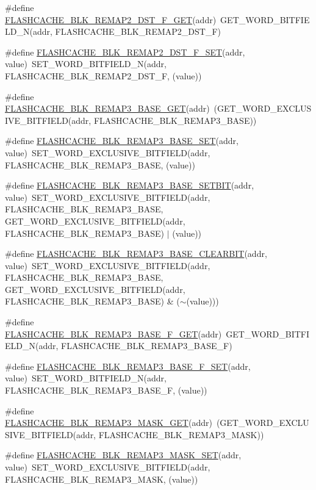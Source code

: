 \begin{DoxyCompactItemize}
\item 
\#define \hyperlink{a00549_a93b9018000a3e28b3af11392ed8f70b0}{FLASHCACHE\_\-BLK\_\-REMAP2\_\-DST\_\-F\_\-GET}(addr)~GET\_\-WORD\_\-BITFIELD\_\-N(addr, FLASHCACHE\_\-BLK\_\-REMAP2\_\-DST\_\-F)
\item 
\#define \hyperlink{a00549_ad04d79373789d38e157b47108411f238}{FLASHCACHE\_\-BLK\_\-REMAP2\_\-DST\_\-F\_\-SET}(addr, value)~SET\_\-WORD\_\-BITFIELD\_\-N(addr, FLASHCACHE\_\-BLK\_\-REMAP2\_\-DST\_\-F, (value))
\item 
\#define \hyperlink{a00549_ae1d60f5aa05a15bb47089b75f00f14db}{FLASHCACHE\_\-BLK\_\-REMAP3\_\-BASE\_\-GET}(addr)~(GET\_\-WORD\_\-EXCLUSIVE\_\-BITFIELD(addr, FLASHCACHE\_\-BLK\_\-REMAP3\_\-BASE))
\item 
\#define \hyperlink{a00549_a2887a17eb1221557a3c3b979bb1a4324}{FLASHCACHE\_\-BLK\_\-REMAP3\_\-BASE\_\-SET}(addr, value)~SET\_\-WORD\_\-EXCLUSIVE\_\-BITFIELD(addr, FLASHCACHE\_\-BLK\_\-REMAP3\_\-BASE, (value))
\item 
\#define \hyperlink{a00549_ab0f2abd345e4119c60d913b40a78522d}{FLASHCACHE\_\-BLK\_\-REMAP3\_\-BASE\_\-SETBIT}(addr, value)~SET\_\-WORD\_\-EXCLUSIVE\_\-BITFIELD(addr, FLASHCACHE\_\-BLK\_\-REMAP3\_\-BASE, GET\_\-WORD\_\-EXCLUSIVE\_\-BITFIELD(addr, FLASHCACHE\_\-BLK\_\-REMAP3\_\-BASE) $|$ (value))
\item 
\#define \hyperlink{a00549_a98552f8503ff25f1520b87c4d094acac}{FLASHCACHE\_\-BLK\_\-REMAP3\_\-BASE\_\-CLEARBIT}(addr, value)~SET\_\-WORD\_\-EXCLUSIVE\_\-BITFIELD(addr, FLASHCACHE\_\-BLK\_\-REMAP3\_\-BASE, GET\_\-WORD\_\-EXCLUSIVE\_\-BITFIELD(addr, FLASHCACHE\_\-BLK\_\-REMAP3\_\-BASE) \& ($\sim$(value)))
\item 
\#define \hyperlink{a00549_a8abeae52163cf0bd75fee69297ed54ac}{FLASHCACHE\_\-BLK\_\-REMAP3\_\-BASE\_\-F\_\-GET}(addr)~GET\_\-WORD\_\-BITFIELD\_\-N(addr, FLASHCACHE\_\-BLK\_\-REMAP3\_\-BASE\_\-F)
\item 
\#define \hyperlink{a00549_a77371996020a42f637ee3f1c84de2266}{FLASHCACHE\_\-BLK\_\-REMAP3\_\-BASE\_\-F\_\-SET}(addr, value)~SET\_\-WORD\_\-BITFIELD\_\-N(addr, FLASHCACHE\_\-BLK\_\-REMAP3\_\-BASE\_\-F, (value))
\item 
\#define \hyperlink{a00549_af8a2efbf09dc42bd9d98ed876d13343c}{FLASHCACHE\_\-BLK\_\-REMAP3\_\-MASK\_\-GET}(addr)~(GET\_\-WORD\_\-EXCLUSIVE\_\-BITFIELD(addr, FLASHCACHE\_\-BLK\_\-REMAP3\_\-MASK))
\item 
\#define \hyperlink{a00549_aead013789d638c56497bbb5890cc88f5}{FLASHCACHE\_\-BLK\_\-REMAP3\_\-MASK\_\-SET}(addr, value)~SET\_\-WORD\_\-EXCLUSIVE\_\-BITFIELD(addr, FLASHCACHE\_\-BLK\_\-REMAP3\_\-MASK, (value))

\end{DoxyCompactItemize}

